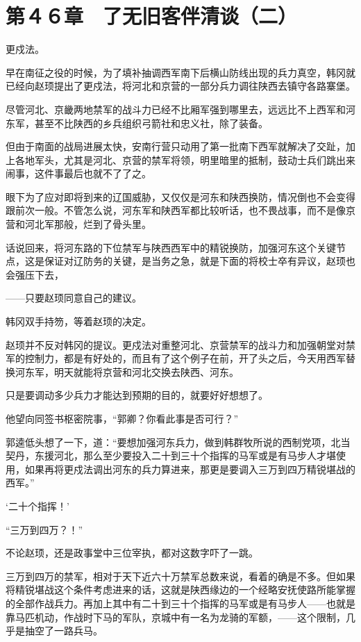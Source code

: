 \section{第４６章　了无旧客伴清谈（二）}

更戍法。

早在南征之役的时候，为了填补抽调西军南下后横山防线出现的兵力真空，韩冈就已经向赵顼提出了更戍法，将河北和京营的一部分兵力调往陕西去镇守各路寨堡。

尽管河北、京畿两地禁军的战斗力已经不比厢军强到哪里去，远远比不上西军和河东军，甚至不比陕西的乡兵组织弓箭社和忠义社，除了装备。

但由于南面的战局进展太快，安南行营只动用了第一批南下西军就解决了交趾，加上各地军头，尤其是河北、京营的禁军将领，明里暗里的抵制，鼓动士兵们跳出来闹事，这件事最后也就不了了之。

眼下为了应对即将到来的辽国威胁，又仅仅是河东和陕西换防，情况倒也不会变得跟前次一般。不管怎么说，河东军和陕西军都比较听话，也不畏战事，而不是像京营和河北军那般，烂到了骨头里。

话说回来，将河东路的下位禁军与陕西西军中的精锐换防，加强河东这个关键节点，这是保证对辽防务的关键，是当务之急，就是下面的将校士卒有异议，赵顼也会强压下去，

——只要赵顼同意自己的建议。

韩冈双手持笏，等着赵顼的决定。

赵顼并不反对韩冈的提议。更戍法对重整河北、京营禁军的战斗力和加强朝堂对禁军的控制力，都是有好处的，而且有了这个例子在前，开了头之后，今天用西军替换河东军，明天就能将京营和河北交换去陕西、河东。

只是要调动多少兵力才能达到预期的目的，就要好好想想了。

他望向同签书枢密院事，“郭卿？你看此事是否可行？”

郭逵低头想了一下，道：“要想加强河东兵力，做到韩群牧所说的西制党项，北当契丹，东援河北，那么至少要投入二十到三十个指挥的马军或是有马步人才堪使用，如果再将更戍法调出河东的兵力算进来，那更是要调入三万到四万精锐堪战的西军。”

‘二十个指挥！’

“三万到四万？！”

不论赵顼，还是政事堂中三位宰执，都对这数字吓了一跳。

三万到四万的禁军，相对于天下近六十万禁军总数来说，看着的确是不多。但如果将精锐堪战这个条件考虑进来的话，这就是陕西缘边的一个经略安抚使路所能掌握的全部作战兵力。再加上其中有二十到三十个指挥的马军或是有马步人——也就是靠马匹机动，作战时下马的军队，京城中有一名为龙骑的军额，——这个限制，几乎是抽空了一路兵马。

